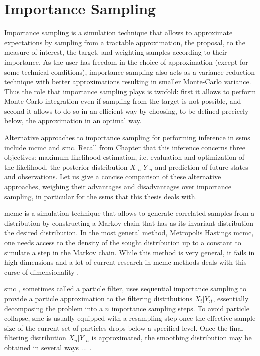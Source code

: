 \section{Importance Sampling}
\label{sec:importance_sampling}
Importance sampling is a simulation technique that allows to approximate expectations by sampling from a tractable approximation, the proposal, to the measure of interest, the target, and weighting samples according to their importance. As the user has freedom in the choice of approximation (except for some technical conditions), importance sampling also acts as a variance reduction technique with better approximations resulting in smaller Monte-Carlo variance. Thus the role that importance sampling plays is twofold: first it allows to perform Monte-Carlo integration even if sampling from the target is not possible, and second it allows to do so in an efficient way by choosing, to be defined precicely below, the approximation in an optimal way.

Alternative approaches to importance sampling for performing inference in \glspl{ssm} include \gls{mcmc} and \gls{smc}. 
Recall from Chapter  that this inference concerns three objectives: maximum likelihood estimation, i.e. evaluation and optimization of the likelihood, the posterior distribution $X_{:n} | Y_{:n}$ and prediction of future states and observations. Let us give a concise comparison of these alternative approaches, weighing their advantages and disadvantages over importance sampling, in particular for the \glspl{ssm} that this thesis deals with. 

\gls{mcmc} is a simulation technique that allows to generate correlated samples from a distribution by constructing a Markov chain that has as its invariant distribution the desired distribution. In the most general method, Metropolis Hastings \gls{mcmc}, one needs access to the density of the sought distribution up to a constant to simulate a step in the Markov chain. While this method is very general, it fails in high dimensions and a lot of current research in \gls{mcmc} methods deals with this  curse of dimensionality . 


\gls{smc} \cite{Chopin2020Introduction}, sometimes called a particle filter, uses sequential importance sampling to provide a particle approximation to the filtering distributions $X_{t} | Y_{:t}$, essentially decomposing the problem into a $n$ importance sampling steps. 
To avoid particle collapse, \gls{smc} is usually equipped with a resampling step once the effective sample size of the current set of particles drops below a specified level. Once the final filtering distribution $X_{n}|Y_{:n}$ is approximated, the smoothing distribution may be obtained in several ways ... .

